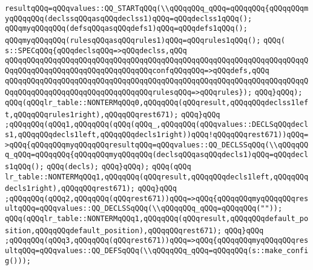 \verb|resultqQQq=qQQqvalues::QQ_STARTqQQq(\\qQQqqQQq_qQQq=qQQqqQQq{qQQqqQQqmyqQQqqQQq(declssqQQqasqQQqdeclss1)qQQq=qQQqdeclss1qQQq();|\newline
\verb|qQQqmyqQQqqQQq(defsqQQqasqQQqdefs1)qQQq=qQQqdefs1qQQq();|\newline
\verb|qQQqmyqQQqqQQq(rulesqQQqasqQQqrules1)qQQq=qQQqrules1qQQq();|\newline
\verb|qQQq(|\newline
\verb|s::SPECqQQq{qQQqdeclsqQQq=>qQQqdeclss,qQQq|\newline
\verb|qQQqqQQqqQQqqQQqqQQqqQQqqQQqqQQqqQQqqQQqqQQqqQQqqQQqqQQqqQQqqQQqqQQqqQQqqQQqqQQqqQQqqQQqqQQqqQQqqQQqqQQqconfqQQqqQQq=>qQQqdefs,qQQq|\newline
\verb|qQQqqQQqqQQqqQQqqQQqqQQqqQQqqQQqqQQqqQQqqQQqqQQqqQQqqQQqqQQqqQQqqQQqqQQqqQQqqQQqqQQqqQQqqQQqqQQqqQQqqQQqrulesqQQq=>qQQqrules});|\newline
\verb|qQQq}qQQq);|\newline
\verb|qQQq(qQQqlr_table::NONTERMqQQq0,qQQqqQQq(qQQqresult,qQQqqQQqdeclss1left,qQQqqQQqrules1right),qQQqqQQqrest671);|\newline
\verb|qQQq}qQQq|\newline
\verb|;qQQqqQQq(qQQq1,qQQqqQQq(qQQq(qQQq_,qQQqqQQq(qQQqvalues::DECLSqQQqdecls1,qQQqqQQqdecls1left,qQQqqQQqdecls1right))qQQq!qQQqqQQqrest671))qQQq=>qQQq{qQQqqQQqmyqQQqqQQqresultqQQq=qQQqvalues::QQ_DECLSSqQQq(\\qQQqqQQq_qQQq=qQQqqQQq{qQQqqQQqmyqQQqqQQq(declsqQQqasqQQqdecls1)qQQq=qQQqdecls1qQQq();|\newline
\verb|qQQq(decls);|\newline
\verb|qQQq}qQQq);|\newline
\verb|qQQq(qQQq|\newline
\verb|lr_table::NONTERMqQQq1,qQQqqQQq(qQQqresult,qQQqqQQqdecls1left,qQQqqQQqdecls1right),qQQqqQQqrest671);|\newline
\verb|qQQq}qQQq|\newline
\verb|;qQQqqQQq(qQQq2,qQQqqQQq(qQQqrest671))qQQq=>qQQq{qQQqqQQqmyqQQqqQQqresultqQQq=qQQqvalues::QQ_DECLSSqQQq(\\qQQqqQQq_qQQq=qQQqqQQq(""));|\newline
\verb|qQQq(qQQqlr_table::NONTERMqQQq1,qQQqqQQq(qQQqresult,qQQqqQQqdefault_position,qQQqqQQqdefault_position),qQQqqQQqrest671);|\newline
\verb|qQQq}qQQq|\newline
\verb|;qQQqqQQq(qQQq3,qQQqqQQq(qQQqrest671))qQQq=>qQQq{qQQqqQQqmyqQQqqQQqresultqQQq=qQQqvalues::QQ_DEFSqQQq(\\qQQqqQQq_qQQq=qQQqqQQq(s::make_config()));|\newline
